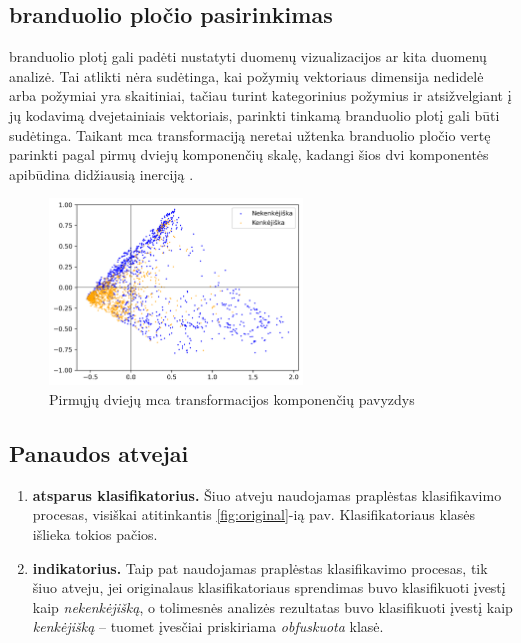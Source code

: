 \clearpage
\subsection{\LIME branduolio pločio pasirinkimas}
\LIME branduolio plotį  gali padėti nustatyti duomenų vizualizacijos ar kita duomenų analizė. Tai atlikti nėra sudėtinga, kai požymių vektoriaus dimensija nedidelė arba požymiai yra skaitiniai, tačiau turint kategorinius požymius ir atsižvelgiant į jų kodavimą dvejetainiais vektoriais, parinkti tinkamą \LIME branduolio plotį gali būti sudėtinga. Taikant \gls{mca} transformaciją neretai užtenka branduolio pločio vertę parinkti pagal pirmų dviejų komponenčių skalę, kadangi šios dvi komponentės apibūdina didžiausią inerciją .
\begin{figure}[h]
        \centering
        \includegraphics[width=0.6\textwidth]{images/mca_scatter.png}
        \caption{Pirmųjų dviejų \gls{mca} transformacijos komponenčių pavyzdys}
        \label{fig:scree}
\end{figure}

\subsection{Panaudos atvejai}
\begin{enumerate}
    \item {\bfseries {} atsparus klasifikatorius.}
     Šiuo atveju naudojamas praplėstas klasifikavimo procesas, visiškai atitinkantis \ref{fig:original}-ią pav. Klasifikatoriaus klasės išlieka tokios pačios. 
    \item {\bfseries {} indikatorius.} 
    Taip pat naudojamas praplėstas klasifikavimo procesas, tik šiuo atveju, jei originalaus klasifikatoriaus sprendimas buvo klasifikuoti įvestį kaip \textit{nekenkėjišką}, o tolimesnės analizės rezultatas buvo klasifikuoti įvestį kaip \textit{kenkėjišką} -- tuomet įvesčiai priskiriama \textit{obfuskuota} klasė. 
\end{enumerate}

